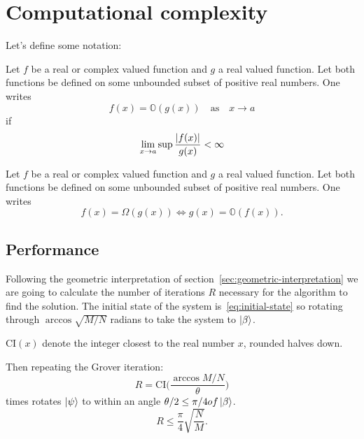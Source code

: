 \section{Computational complexity}
Let's define some notation:
\begin{defn}
   Let $f$ be a real or complex valued function and $g$ a real valued function. Let both functions be defined on some unbounded subset of positive real numbers. One writes
   \begin{equation*}
       f(x) = \mathbb{O}(g(x)) \quad \text{as} \quad x \rightarrow a
   \end{equation*}
   if 
   \begin{equation*}
      \lim_{x \to a} \sup{\frac{\lvert f(x)\rvert}{g(x)}} < \infty
   \end{equation*}
   \end{defn}
   \begin{defn}
      Let $f$ be a real or complex valued function and $g$ a real valued function. Let both functions be defined on some unbounded subset of positive real numbers. One writes
   \begin{equation*}
       f(x) = \Omega(g(x))
    \Longleftrightarrow
      g(x) = \mathbb{O}(f(x)).
   \end{equation*}
   \end{defn}
   

\subsection{Performance}\label{sec:performance}
Following the geometric interpretation of section~\ref{sec:geometric-interpretation} we are going to calculate the number of iterations $R$ necessary for the algorithm to find the solution. The initial state of the system is~\ref{eq:initial-state} so rotating through $\arccos{\sqrt{M/N}}$ radians to take the system to $\ket{\beta}$.
\begin{defn}
$\text{CI}(x)$ denote the integer closest to the real number $x$, rounded halves down.
\end{defn}
Then repeating the Grover iteration:
\begin{equation*}
    R = \text{CI}\biggl(\frac{\arccos{M/N}}{\theta}\biggr)
\end{equation*}
times rotates $\ket{\psi}$ to within an angle $\theta/2 \leq \pi/4 of \ket{\beta}$.
\begin{equation*}
    R \leq \frac{\pi}{4} \sqrt{\frac{N}{M}}.
\end{equation*}

